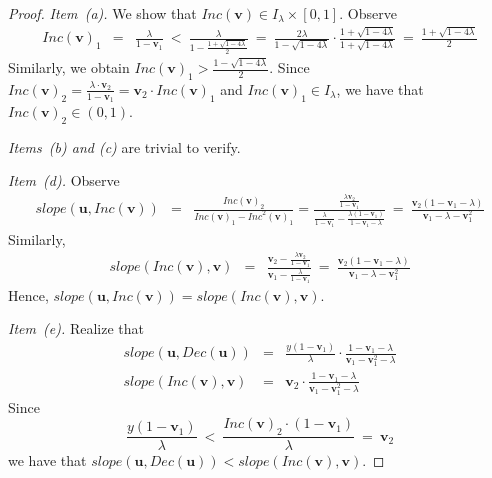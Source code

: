 \documentclass[a4paper,UKenglish,cleveref, autoref, thm-restate]{lipics-v2021}
\newcommand{\slope}{\mathit{slope}}
\newcommand{\INC}{\mathit{Inc}}
\newcommand{\DEC}{\mathit{Dec}}
\renewcommand{\vec}[1]{\pmb{#1}}
\begin{document}
\incfunction*
\begin{proof}
\textit{Item~(a).} We show that $\INC(\vec{v}) \in I_\lambda \times [0,1]$. Observe
    \begin{eqnarray*}
        \INC(\vec{v})_1 & = & \frac{\lambda}{1-\vec{v}_1}
           \ < \ \frac{\lambda}{1-\frac{1+\sqrt{1-4\lambda}}{2}}
           \ = \ \frac{2\lambda}{1- \sqrt{1-4\lambda}} \cdot \frac{1+\sqrt{1-4\lambda}}{1+\sqrt{1-4\lambda}}
           \ = \ \frac{1+\sqrt{1-4\lambda}}{2}
    \end{eqnarray*}
    Similarly, we obtain $\INC(\vec{v})_1 >  \frac{1-\sqrt{1-4\lambda}}{2}$. Since $\INC(\vec{v})_2 = \frac{\lambda \cdot \vec{v}_2}{1{-}\vec{v}_1} = \vec{v}_2 \cdot \INC(\vec{v})_1$ and $\INC(\vec{v})_1 \in I_\lambda$, we have that $\INC(\vec{v})_2 \in (0,1)$.

\smallskip  
\noindent
\textit{Items~(b) and (c)} are trivial to verify.
 
\smallskip
\noindent
\textit{Item~(d).}  Observe
\begin{eqnarray*}
    \slope(\vec{u},\INC(\vec{v})) & = & \frac{\INC(\vec{v})_2}{\INC(\vec{v})_1 - \INC^2(\vec{v})_1} = \frac{\frac{\lambda \vec{v}_2}{1-\vec{v}_1}}{\frac{\lambda}{1-\vec{v}_1}-\frac{\lambda(1-\vec{v}_1)}{1-\vec{v}_1 -\lambda}} \ = \
    \frac{\vec{v}_2(1-\vec{v}_1-\lambda)}{\vec{v}_1 - \lambda - \vec{v}_1^2}
 \end{eqnarray*}
Similarly,
\begin{eqnarray*}
    \slope(\INC(\vec{v}),\vec{v}) & = &  
    \frac{\vec{v}_2 - \frac{\lambda \vec{v}_2}{1-\vec{v}_1}}{\vec{v}_1 - \frac{\lambda}{1-\vec{v}_1}} \ = \   
    \frac{\vec{v}_2(1-\vec{v}_1-\lambda)}{\vec{v}_1 - \lambda - \vec{v}_1^2}  
\end{eqnarray*}
Hence, $\slope(\vec{u},\INC(\vec{v})) = \slope(\INC(\vec{v}),\vec{v})$.

\smallskip
\noindent
\textit{Item~(e).} Realize that 
\begin{eqnarray*}    
    \slope(\vec{u},\DEC(\vec{u})) & = & \frac{y(1-\vec{v}_1)}{\lambda} \cdot \frac{1-\vec{v}_1-\lambda}{\vec{v}_1 -\vec{v}_1^2-\lambda}\\[1ex]
    \slope(\INC(\vec{v}),\vec{v}) & = & \vec{v}_2 \cdot \frac{1-\vec{v}_1-\lambda}{\vec{v}_1 -\vec{v}_1^2-\lambda}
\end{eqnarray*}
Since 
\begin{equation*}
    \frac{y(1-\vec{v}_1)}{\lambda} \ < \ \frac{\INC(\vec{v})_2 \cdot (1-\vec{v}_1)}{\lambda}  \ = \ \vec{v}_2   
\end{equation*}
we have that $\slope(\vec{u},\DEC(\vec{u})) < \slope(\INC(\vec{v}),\vec{v})$.


\end{proof}
\end{document}

